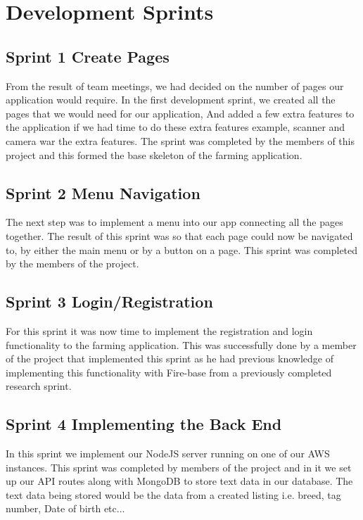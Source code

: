 \documentclass[12pt,a4paper,oneside,openany]{book}
\begin{document}
\section{Development Sprints}\label{development_sprints}

\subsection{Sprint 1 Create Pages}
From the result of team meetings, we had decided on the number of pages our application would require. In the first development sprint, we created all the pages that we would need for our application, And added a few extra features to the application if we had time to do these extra features example, scanner and camera war the extra features. The sprint was completed by the members of this project and this formed the base skeleton of the farming application.

\subsection{Sprint 2 Menu Navigation}
The next step was to implement a menu into our app connecting all the pages together. The result of this sprint was so that each page could now be navigated to, by either the main menu or by a button on a page. This sprint was completed by the members of the project.

\subsection{Sprint 3 Login/Registration}
For this sprint it was now time to implement the registration and login functionality to the farming application. This was successfully done by a member of the project that implemented this sprint as he had previous knowledge of implementing this functionality with Fire-base from a previously completed research sprint.

\subsection{Sprint 4 Implementing the Back End}
In this sprint we implement our NodeJS server running on one of our AWS instances. This sprint was completed by members of the project and in it we set up our API routes along with MongoDB to store text data in our database. The text data being stored would be the data from a created listing i.e. breed, tag number, Date of birth etc...
\end{document}
